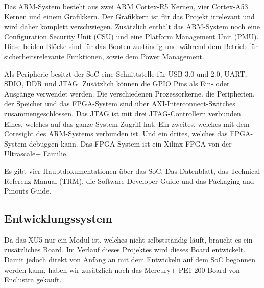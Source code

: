 Das ARM-System besteht aus zwei ARM Cortex-R5 Kernen, vier Cortex-A53 Kernen und einem Grafikkern. Der Grafikkern ist für das Projekt irrelevant und wird daher komplett verschwiegen. Zusätzlich enthält das ARM-System noch eine Configuration Security Unit (CSU) und eine Platform Management Unit (PMU). Diese beiden Blöcke sind für das Booten zuständig und während dem Betrieb für sicherheitsrelevante Funktionen, sowie dem Power Management.

Als Peripherie besitzt der SoC eine Schnittstelle für USB 3.0 und 2.0, UART, SDIO, DDR und JTAG. Zusätzlich können die GPIO Pins als Ein- oder Ausgänge verwendet werden. Die verschiedenen Prozessorkerne. die Peripherien, der Speicher und das FPGA-System sind über AXI-Interconnect-Switches zusammengeschlossen. Das JTAG ist mit drei JTAG-Controllern verbunden. Eines, welches auf das ganze System Zugriff hat, Ein zweites, welches mit dem Coresight des ARM-Systems verbunden ist. Und ein drites, welches das FPGA-System debuggen kann. Das FPGA-System ist ein Xilinx FPGA von der Ultrascale+ Familie. 

Es gibt vier Hauptdokumentationen über das SoC. Das Datenblatt\cite{datasheet}, das Technical Referenz Manual (TRM)\cite{trm}, die Software Developer Guide\cite{software} und das Packaging and Pinouts Guide\cite{packaging}.


\subsection{Entwicklungssystem}
Da das XU5 nur ein Modul ist, welches nicht selbstständig läuft, braucht es ein zusätzliches Board. Im Verlauf dieses Projektes wird dieses Board entwickelt. Damit jedoch direkt von Anfang an mit dem Entwickeln auf dem SoC begonnen werden kann, haben wir zusätzlich noch das Mercury+ PE1-200 Board von Enclustra gekauft. 

